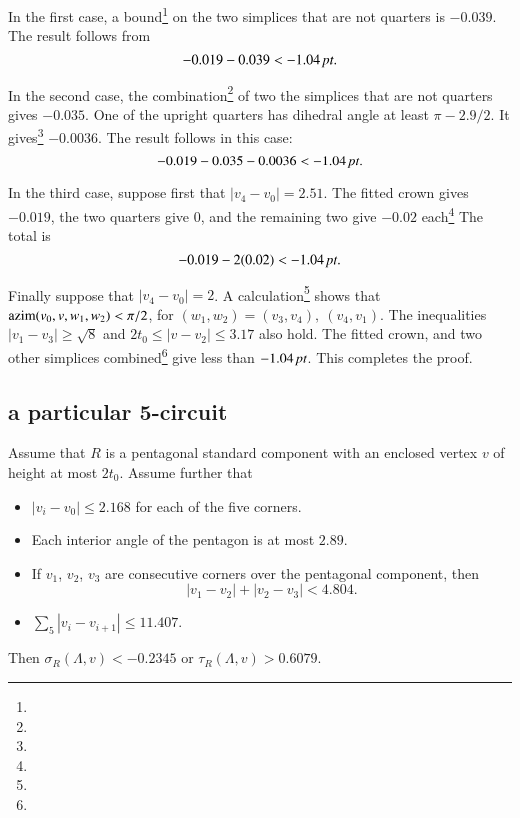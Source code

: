\begin{proved}
In the first case, a bound\footnote{} 
on the two simplices that are not quarters is $-0.039$.
The result follows from
  $$
  -0.019 - 0.039 < -1.04\,\hbox{\it pt}.
  $$

In the second case, the 
combination\footnote{ } of two the simplices
that are not quarters gives $-0.035$.
One of the upright quarters has dihedral angle at least
$\pi-2.9/2$.  It gives\footnote{} $-0.0036$.
The result follows in this case:
   $$
   -0.019 - 0.035 - 0.0036 < -1.04\,\hbox{\it pt}.
   $$

In the third case, suppose first that $|v_4-v_0|=2.51$.  The
fitted crown gives $-0.019$, the two quarters give $0$, and the
remaining two give $-0.02$ each\footnote{}  The
total is
$$
  -0.019 - 2 (0.02) < -1.04\,\hbox{\it pt}.
$$

Finally suppose that $|v_4-v_0| =2$.  A calculation\footnote{} shows that ${\operatorname{azim}}(v_0,v,w_1,w_2) < \pi/2$, for $(w_1,w_2)=(v_3,v_4),\ (v_4,v_1)$.  The inequalities $|v_1-v_3|\ge \sqrt8$ and $2t_0\le |v-v_2|\le 3.17$
also hold.
The fitted crown, and two other
simplices combined\footnote{} give less than $-1.04\,\hbox{\it pt}$.
This completes the proof.
\swallowed\end{proved}




\subsection{a particular 5-circuit} %

\begin{lemma}\label{lemma:6079}  
Assume that $R$ is a pentagonal standard component
    with an enclosed vertex $v$ of height at most $2t_0$.
    Assume further that
    \begin{itemize}
        \item $|v_i-v_0|\le 2.168$ for each of the five corners.
        \item Each interior angle of the pentagon is at most
        $2.89$.
        \item If $v_1$, $v_2$, $v_3$ are consecutive corners over
        the pentagonal component, then $$|v_1-v_2|+|v_2-v_3|<4.804.$$
        \item $\sum_5 |v_i-v_{i+1}|\le 11.407.$
    \end{itemize}
    Then $\sigma_R(\Lambda,v)< -0.2345$ or $\tau_R(\Lambda,v) > 0.6079.$
\end{lemma}

